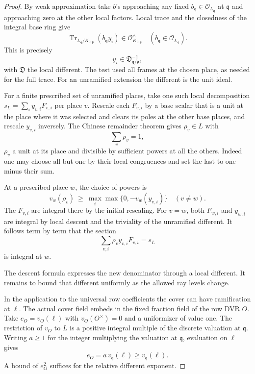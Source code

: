 \begin{proof}
By weak approximation take \(b\)'s approaching any fixed
\(b_\mathfrak q\in\mathcal O_{L_\mathfrak q}\) at \(\mathfrak q\)
and approaching zero at the other local factors. Local
trace and the closedness of the integral base ring give
\[
   \operatorname{Tr}_{L_\mathfrak q/K_{0,\mathfrak p}}
             (b_\mathfrak q y_i)\in
                   \mathcal O_{K_{0,\mathfrak p}}^{\wedge}
      \quad(b_\mathfrak q\in\mathcal O_{L_\mathfrak q}).
\]
This is precisely
\[
 y_i\in\mathfrak D_{\mathfrak q/\mathfrak p}^{-1},
\]
with \(\mathfrak D\) the local different. The test used
all frames at the chosen place, as needed for the full trace.
For an unramified extension the different is the unit ideal.

For a finite prescribed set of unramified places, take one such
local decomposition \(s_L=\sum_i y_{v,i}F_{v,i}\) per place \(v\).
Rescale each \(F_{v,i}\) by a base scalar that is a unit
at the place where it was selected and clears its poles at
the other base places, and rescale \(y_{v,i}\) inversely.
The Chinese remainder theorem gives \(\rho_v\in L\) with
\[
 \sum_v\rho_v=1,
\]
\(\rho_v\) a unit at its place and
divisible by sufficient powers at all the others. Indeed one
may choose all but one by their local congruences and set
the last to one minus their sum.

At a prescribed place \(w\), the choice of powers is
\[
 v_w(\rho_v)\ \ge\
      \max_i\max\{0,-v_w(y_{v,i})\}\quad (v\ne w).
\]
The \(F_{v,i}\) are integral there by the initial rescaling.
For \(v=w\), both \(F_{w,i}\) and \(y_{w,i}\) are integral by
local descent and the triviality of the unramified different.
It follows term by term that the section
\[
 \sum_{v,i}\rho_v y_{v,i}F_{v,i}=s_L
\]
is integral at \(w\).

The descent formula expresses the new denominator through a local different. It remains to bound that different uniformly as the allowed ray levels change.

In the application to the universal row coefficients the
cover can have ramification at \(\ell\). The actual cover
field embeds in the fixed fraction field of the row DVR
\(O\). Take \(e_O=v_{\!O}(\ell)\) with \(v_{\!O}(O^\times)=0\)
and a uniformizer of value one. The restriction of \(v_{\!O}\)
to \(L\) is a positive integral multiple of the discrete
valuation at \(\mathfrak q\). Writing \(a\ge1\) for the integer multiplying the valuation at \(\mathfrak q\), evaluation on \(\ell\) gives
\[
 e_O=a\,v_{\mathfrak q}(\ell)\ge v_{\mathfrak q}(\ell).
\]
A bound of
\(e_O^2\) suffices for the relative different exponent.


\end{proof}

